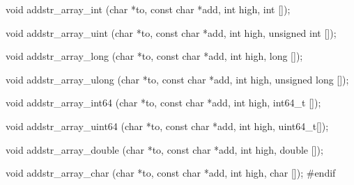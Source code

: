 void  addstr_array_int (char *to, const char *add, int high, int []);

void  addstr_array_uint (char *to, const char *add, int high,
                        unsigned int []);

void  addstr_array_long (char *to, const char *add, int high, long []);

void  addstr_array_ulong (char *to, const char *add, int high,
                         unsigned long []);

void  addstr_array_int64 (char *to, const char *add, int high, int64_t []);

void  addstr_array_uint64 (char *to, const char *add, int high, uint64_t[]);

void  addstr_array_double (char *to, const char *add, int high, double []);

void  addstr_array_char (char *to, const char *add, int high, char []);
\hide
#endif
\endhide\endcode

